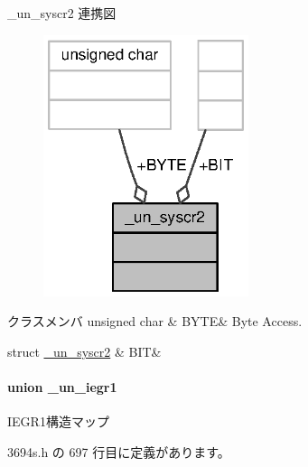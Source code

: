 \+\_\+un\+\_\+syscr2 連携図
\nopagebreak
\begin{figure}[H]
\begin{center}
\leavevmode
\includegraphics[width=170pt]{d5/dac/union__un__syscr2__coll__graph}
\end{center}
\end{figure}
\begin{DoxyFields}{クラスメンバ}
unsigned char\label{3694s_8h_a665a520aacdc483fa154de983e6ef2a4}
&
B\+Y\+T\+E&
Byte Access. \\
\hline

struct \hyperlink{3694s_8h_dd/d1f/struct__un__syscr2_8BIT}{\+\_\+un\+\_\+syscr2}\label{3694s_8h_a9ab2f84a68051592d7b31730c8d06eab}
&
B\+I\+T&
\\
\hline

\end{DoxyFields}
\label{union__un__iegr1}
\paragraph{union \+\_\+un\+\_\+iegr1}
I\+E\+G\+R1構造マップ 

 3694s.\+h の 697 行目に定義があります。



